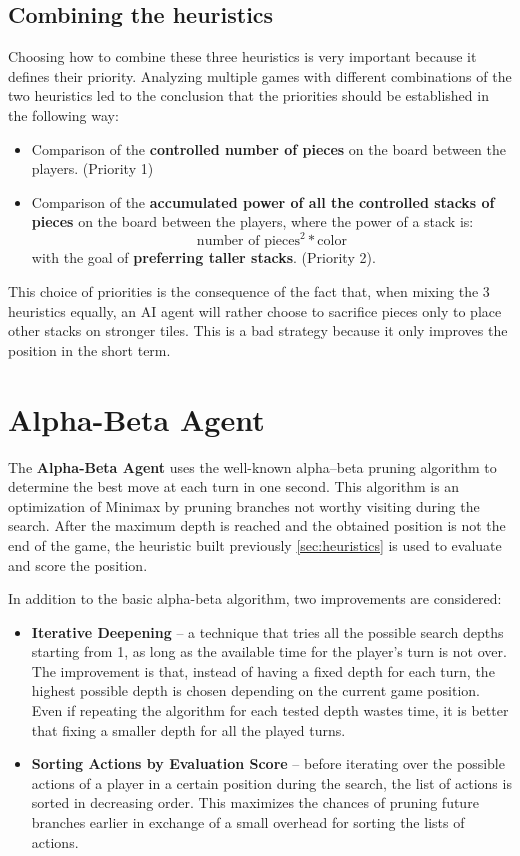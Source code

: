 \subsection{Combining the heuristics}

Choosing how to combine these three heuristics is very important because it defines their priority. Analyzing multiple games with different combinations of the two heuristics led to the conclusion that the priorities should be established in the following way:

\begin{itemize}
    \item Comparison of the \textbf{controlled number of pieces} on the board between the players. (Priority 1)
    \item Comparison of the \textbf{accumulated power of all the controlled stacks of pieces} on the board between the players, where the power of a stack is:
    \[ \text{number of pieces}^2 * \text{color} \]
    with the goal of \textbf{preferring taller stacks}. (Priority 2).
\end{itemize}

This choice of priorities is the consequence of the fact that, when mixing the 3 heuristics equally, an AI agent will rather choose to sacrifice pieces only to place other stacks on stronger tiles. This is a bad strategy because it only improves the position in the short term.

\section{Alpha-Beta Agent}

The \textbf{Alpha-Beta Agent} uses the well-known alpha–beta pruning algorithm \cite{alpha_beta} to determine the best move at each turn in one second. This algorithm is an optimization of Minimax by pruning branches not worthy visiting during the search. After the maximum depth is reached and the obtained position is not the end of the game, the heuristic built previously \ref{sec:heuristics} is used to evaluate and score the position.

In addition to the basic alpha-beta algorithm, two improvements are considered:

\begin{itemize}
    \item \textbf{Iterative Deepening} -- a technique that tries all the possible search depths starting from 1, as long as the available time for the player's turn is not over. The improvement is that, instead of having a fixed depth for each turn, the highest possible depth is chosen depending on the current game position. Even if repeating the algorithm for each tested depth wastes time, it is better that fixing a smaller depth for all the played turns.
    \item \textbf{Sorting Actions by Evaluation Score} -- before iterating over the possible actions of a player in a certain position during the search, the list of actions is sorted in decreasing order. This maximizes the chances of pruning future branches earlier in exchange of a small overhead for sorting the lists of actions. 
\end{itemize}

